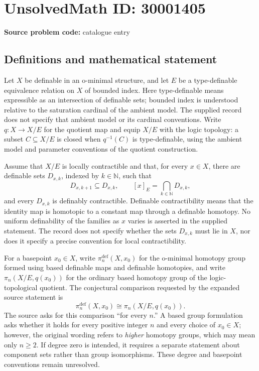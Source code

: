 \documentclass[11pt]{article}
\newcommand{\N}{\mathbb{N}}
\begin{document}
\section*{UnsolvedMath ID: 30001405}
\textbf{Source problem code:} catalogue entry
\subsection{Definitions and mathematical statement}
Let \(X\) be definable in an o-minimal structure, and let \(E\) be a type-definable equivalence relation on \(X\) of bounded index. Here type-definable means expressible as an intersection of definable sets; bounded index is understood relative to the saturation cardinal of the ambient model. The supplied record does not specify that ambient model or its cardinal conventions. Write \(q\colon X\to X/E\) for the quotient map and equip \(X/E\) with the logic topology: a subset \(C\subseteq X/E\) is closed when \(q^{-1}(C)\) is type-definable, using the ambient model and parameter conventions of the quotient construction.

Assume that \(X/E\) is locally contractible and that, for every \(x\in X\), there are definable sets \(D_{x,k}\), indexed by \(k\in\N\), such that
\[
D_{x,k+1}\subseteq D_{x,k},\qquad
[x]_E=\bigcap_{k\in\N}D_{x,k},
\]
and every \(D_{x,k}\) is definably contractible. Definable contractibility means that the identity map is homotopic to a constant map through a definable homotopy. No uniform definability of the families as \(x\) varies is asserted in the supplied statement. The record does not specify whether the sets \(D_{x,k}\) must lie in \(X\), nor does it specify a precise convention for local contractibility.

For a basepoint \(x_0\in X\), write \(\pi_n^{\mathrm{def}}(X,x_0)\) for the o-minimal homotopy group formed using based definable maps and definable homotopies, and write \(\pi_n(X/E,q(x_0))\) for the ordinary based homotopy group of the logic-topological quotient. The conjectural comparison requested by the expanded source statement is
\[
\pi_n^{\mathrm{def}}(X,x_0)\cong
\pi_n(X/E,q(x_0)).
\]
The source asks for this comparison ``for every \(n\).'' A based group formulation asks whether it holds for every positive integer \(n\) and every choice of \(x_0\in X\); however, the original wording refers to \emph{higher} homotopy groups, which may mean only \(n\geq2\). If degree zero is intended, it requires a separate statement about component sets rather than group isomorphisms. These degree and basepoint conventions remain unresolved.
\end{document}
